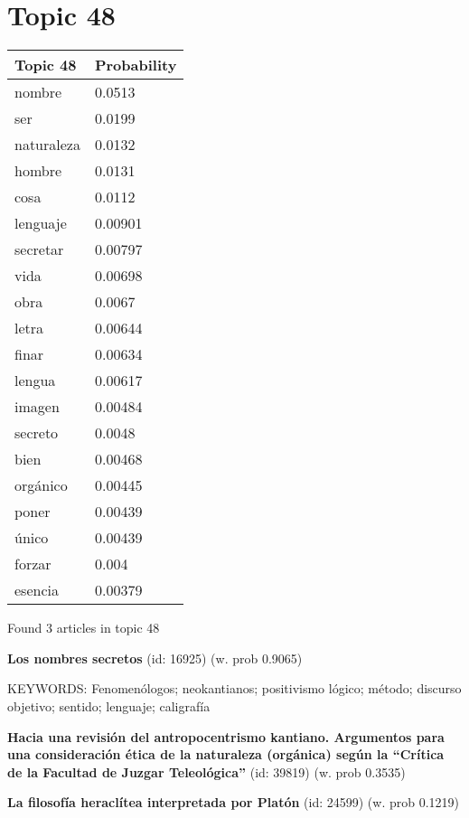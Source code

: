 \documentclass{article}
\begin{document}
\section*{Topic 48}\vfill
\begin{tabular}{ll}
\toprule
   Topic 48 & Probability \\
\midrule
     nombre &      0.0513 \\
        ser &      0.0199 \\
 naturaleza &      0.0132 \\
     hombre &      0.0131 \\
       cosa &      0.0112 \\
   lenguaje &     0.00901 \\
   secretar &     0.00797 \\
       vida &     0.00698 \\
       obra &      0.0067 \\
      letra &     0.00644 \\
      finar &     0.00634 \\
     lengua &     0.00617 \\
     imagen &     0.00484 \\
    secreto &      0.0048 \\
       bien &     0.00468 \\
   orgánico &     0.00445 \\
      poner &     0.00439 \\
      único &     0.00439 \\
     forzar &       0.004 \\
    esencia &     0.00379 \\
\bottomrule
\end{tabular}

\vfill
Found 3 articles in topic 48
\vfill

\textbf{Los nombres secretos} (id: 16925)
 (w. prob 0.9065)


KEYWORDS:
Fenomenólogos; neokantianos; positivismo lógico; método; discurso objetivo; sentido; lenguaje; caligrafía
\vfill

\textbf{Hacia una revisión del antropocentrismo kantiano. Argumentos para una consideración ética de la naturaleza (orgánica)  según la “Crítica de la Facultad de Juzgar Teleológica”} (id: 39819)
 (w. prob 0.3535)
\vfill

\textbf{La filosofía heraclítea interpretada por Platón} (id: 24599)
 (w. prob 0.1219)

\vfill
\newpage
\end{document}
